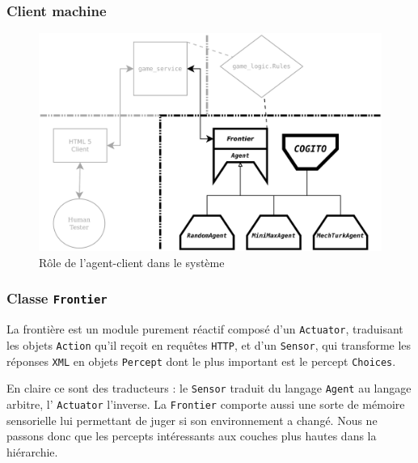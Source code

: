 \subsubsection{Client machine}

\begin{figure}[H] 
\centering
\includegraphics[width=\textwidth]{files/william/archi_client_machine} 
\caption{Rôle de l'agent-client dans le système} 
\end{figure}

\subsubsection{Classe \texttt{Frontier}}
La frontière est un module purement réactif composé d'un \texttt{Actuator}, traduisant les objets \texttt{Action} qu'il reçoit en requêtes \texttt{HTTP}, et d'un \texttt{Sensor}, qui transforme les réponses \texttt{XML} en objets \texttt{Percept} dont le plus important est le percept \texttt{Choices}.

En claire ce sont des traducteurs : le \texttt{Sensor} traduit du langage \texttt{Agent} au langage arbitre, l' \texttt{Actuator} l'inverse. La \texttt{Frontier} comporte aussi une sorte de mémoire sensorielle lui permettant de juger si son environnement a changé. Nous ne passons donc que les percepts intéressants aux couches plus hautes dans la hiérarchie.  

